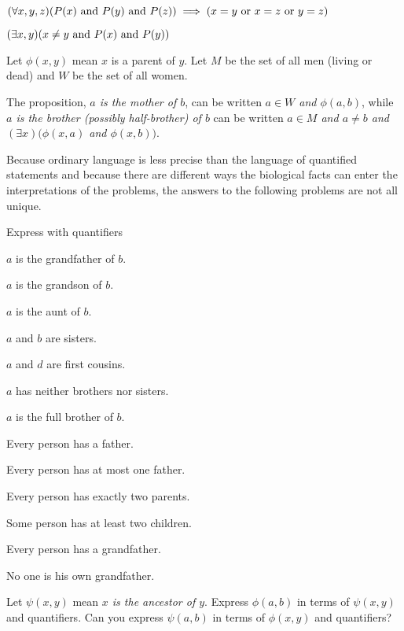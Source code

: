 \begin{solution}
\begin{enumalpha}
    \item $(\forall x,y,z)\prn{P(x)\land P(y)\land P(z)}\implies (x=y\lor x=z\lor y=z)$
    \item $(\exists x,y)\prn{x\neq y \land P(x)\land P(y)}$
\end{enumalpha}
\end{solution}

\begin{exercise}
Let $\phi(x, y)$ mean $x$ is a parent of $y$. Let $M$ be the set of all men (living or dead)
and $W$ be the set of all women.

The proposition, \textit{$a$ is the mother of $b$}, can be written \textit{$a\in W$ and $\phi(a, b)$}, while \textit{$a$ is the
brother (possibly half-brother) of $b$} can be written \textit{$a\in M$ and $a\neq b$ and $(\exists x) (\phi(x, a)$ and
$\phi(x, b))$}.

Because ordinary language is less precise than the language of quantified statements
and because there are different ways the biological facts can enter the interpretations of
the problems, the answers to the following problems are not all unique.

Express with quantifiers
\begin{enumalpha}
    \item $a$ is the grandfather of $b$.
    \item $a$ is the grandson of $b$.
    \item $a$ is the aunt of $b$. 
    \item $a$ and $b$ are sisters.
    \item $a$ and $d$ are first cousins. 
    \item $a$ has neither brothers nor sisters.
    \item $a$ is the full brother of $b$.
    \item Every person has a father.
    \item Every person has at most one father.
    \item Every person has exactly two parents.
    \item Some person has at least two children.
    \item Every person has a grandfather.
    \item No one is his own grandfather.
\end{enumalpha}

Let $\psi(x, y)$ mean \textit{$x$ is the ancestor of $y$}. Express $\phi(a,b)$ in terms of $\psi(x,y)$ and
quantifiers. Can you express $\psi(a, b)$ in terms of $\phi(x,y)$ and quantifiers?
\end{exercise}

